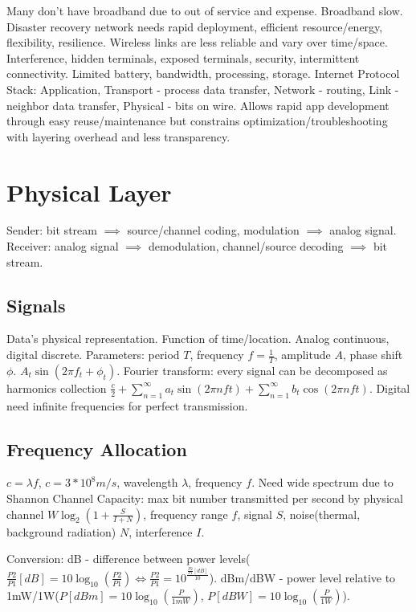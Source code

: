 \documentclass[9pt]{extarticle}
\begin{document}
\begin{multicols}{2}

Many don't have broadband due to out of service and expense. Broadband slow. Disaster recovery network needs rapid deployment, efficient resource/energy, flexibility, resilience. Wireless links are less reliable and vary over time/space. Interference, hidden terminals, exposed terminals, security, intermittent connectivity. Limited battery, bandwidth, processing, storage. Internet Protocol Stack: Application, Transport - process data transfer, Network - routing, Link - neighbor data transfer, Physical - bits on wire. Allows rapid app development through easy reuse/maintenance but constrains optimization/troubleshooting with layering overhead and less transparency.

\section{Physical Layer}

Sender: bit stream $\implies$ source/channel coding, modulation $\implies$ analog signal. Receiver: analog signal $\implies$ demodulation, channel/source decoding $\implies$ bit stream.

\subsection{Signals} 

Data's physical representation. Function of time/location. Analog continuous, digital discrete. Parameters: period $T$, frequency $f = \frac{1}{T}$, amplitude $A$, phase shift $\phi$. $A_t\sin{(2\pi{f_t}+\phi_t)}$. Fourier transform: every signal can be decomposed as harmonics collection $\frac{c}{2}+\sum_{n=1}^{\infty}a_t\sin{(2\pi{n}ft)} + \sum_{n=1}^{\infty}b_t\cos{(2\pi{n}ft)}$. Digital need infinite frequencies for perfect transmission.

\subsection{Frequency Allocation}
 
$c=\lambda{f}$, $c=3*10^8m/s$, wavelength $\lambda$, frequency $f$. Need wide spectrum due to Shannon Channel Capacity: max bit number transmitted per second by physical channel $W\log_2{(1+\frac{S}{I+N})}$, frequency range $f$, signal $S$, noise(thermal, background radiation) $N$, interference $I$. 

Conversion: dB - difference between power levels($\frac{P2}{P1}[dB]=10\log_{10}{(\frac{P2}{P1})} \iff \frac{P2}{P1}=10^{\frac{\frac{P2}{P1}[dB]}{10}}$). dBm/dBW - power level relative to 1mW/1W($P[dBm] = 10\log_{10}{(\frac{P}{1mW})}$, $P[dBW] = 10\log_{10}{(\frac{P}{1W})}$).


\end{multicols}
\end{document}
